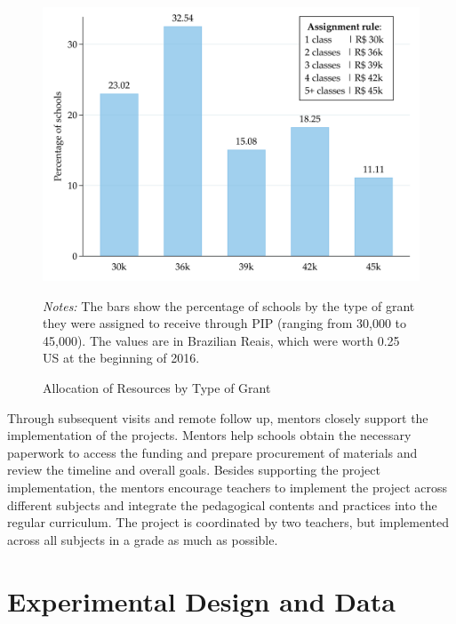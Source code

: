 \documentclass[11pt,a4paper]{article}
\begin{document}
\vspace{6pt}

\begin{figure}[ht!]
    \caption{Allocation of Resources by Type of Grant}
    \label{fig:grant}
    \centering
    
    \includegraphics[width=13cm]{DataWork/Output/Figures/fig3-grant.png}
    
    \begin{minipage}{0.8\textwidth}
        \small{\textit{Notes:} The bars show the percentage of schools by the type of grant they were assigned to receive through PIP (ranging from 30,000 to 45,000). The values are in Brazilian Reais, which were worth 0.25 US at the beginning of 2016.}
    \end{minipage}
    
\end{figure}
%

Through subsequent visits and remote follow up, mentors closely support the implementation of the projects. Mentors help schools obtain the necessary paperwork to access the funding and prepare procurement of materials and review the timeline and overall goals. Besides supporting the project implementation, the mentors encourage teachers to implement the project across different subjects and integrate the pedagogical contents and practices into the regular curriculum. The project is coordinated by two teachers, but implemented across all subjects in a grade as much as possible. 



\section{Experimental Design and Data} \label{sec:design_data}
\end{document}
